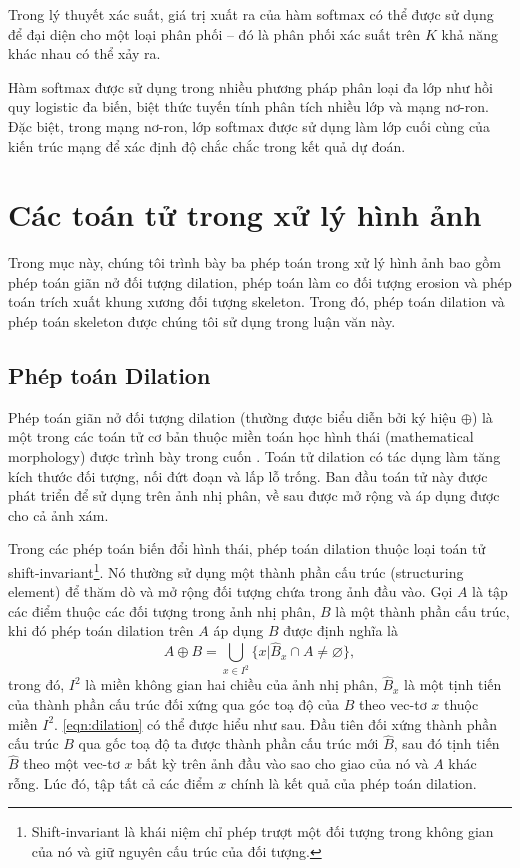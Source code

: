 	Trong lý thuyết xác suất, giá trị xuất ra của hàm softmax có thể được sử dụng để đại diện cho một loại phân phối -- đó là phân phối xác suất trên $K$ khả năng khác nhau có thể xảy ra.
	
	Hàm softmax được sử dụng trong nhiều phương pháp phân loại đa lớp như hồi quy logistic đa biến, biệt thức tuyến tính phân tích nhiều lớp và mạng nơ-ron. Đặc biệt, trong mạng nơ-ron, lớp softmax được sử dụng làm lớp cuối cùng của kiến trúc mạng để xác định độ chắc chắc trong kết quả dự đoán.
	
\newpage
\section{Các toán tử trong xử lý hình ảnh} 
\label{sec:cac_toan_tu_trong_xu_ly_hinh_anh}
	Trong mục này, chúng tôi trình bày ba phép toán trong xử lý hình ảnh bao gồm phép toán giãn nở đối tượng dilation, phép toán làm co đối tượng erosion và phép toán trích xuất khung xương đối tượng skeleton. Trong đó, phép toán dilation và phép toán skeleton được chúng tôi sử dụng trong luận văn này.

\subsection{Phép toán Dilation}
\label{subsec:phep_toan_dilation}
	Phép toán giãn nở đối tượng dilation (thường được biểu diễn bởi ký hiệu $\oplus$) là một trong các toán tử cơ bản thuộc miền toán học hình thái (mathematical morphology) được \citeauthor{weeks1996fundamentals} \cite{weeks1996fundamentals} trình bày trong cuốn . Toán tử dilation có tác dụng làm tăng kích thước đối tượng, nối đứt đoạn và lấp lỗ trống. Ban đầu toán tử này được phát triển để sử dụng trên ảnh nhị phân, về sau được mở rộng và áp dụng được cho cả ảnh xám.
	
	Trong các phép toán biến đổi hình thái, phép toán dilation thuộc loại toán tử shift-invariant\footnote{Shift-invariant là khái niệm chỉ phép trượt một đối tượng trong không gian của nó và giữ nguyên cấu trúc của đối tượng.}. Nó thường sử dụng một thành phần cấu trúc (structuring element) để thăm dò và mở rộng đối tượng chứa trong ảnh đầu vào. Gọi $A$ là tập các điểm thuộc các đối tượng trong ảnh nhị phân, $B$ là một thành phần cấu trúc, khi đó phép toán dilation trên $A$ áp dụng $B$ được định nghĩa là 
	\begin{equation}
		A \oplus B = \bigcup_{x\in I^2}\{x|\hat{B}_x\cap A\neq\varnothing\},
		\label{eqn:dilation}
	\end{equation}
	trong đó, $I^2$ là miền không gian hai chiều của ảnh nhị phân, $\hat{B}_x$ là một tịnh tiến của thành phần cấu trúc đối xứng qua góc toạ độ của $B$ theo vec-tơ $x$ thuộc miền $I^2$. \autoref{eqn:dilation} có thể được hiểu như sau. Đầu tiên đối xứng thành phần cấu trúc $B$ qua gốc toạ độ ta được thành phần cấu trúc mới $\hat{B}$, sau đó tịnh tiến $\hat{B}$ theo một vec-tơ $x$ bất kỳ trên ảnh đầu vào sao cho giao của nó và $A$ khác rỗng. Lúc đó, tập tất cả các điểm $x$ chính là kết quả của phép toán dilation.
	
